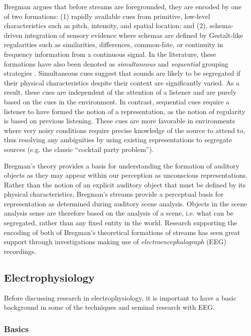 Bregman argues that before streams are foregrounded, they are encoded by one of two formations: (1) rapidly available cues from primitive, low-level characteristics such as pitch, intensity, and spatial location; and (2), schema-driven integration of sensory evidence where schemas are defined by Gestalt-like regularities such as similarities, differences, common-fate, or continuity in frequency information from a continuous signal.  In the literature, these formations have also been denoted as \textit{simultaneous} and \textit{sequential} grouping strategies \cite{Winkler2009a}.  Simultaneous cues suggest that sounds are likely to be segregated if their physical characteristics despite their context are significantly varied.  As a result, these cues are independent of the attention of a listener and are purely based on the cues in the environment.  In contrast, sequential cues require a listener to have formed the notion of a representation, as the notion of regularity is based on previous listening.  These cues are more favorable in environments where very noisy conditions require precise knowledge of the source to attend to, thus resolving any ambiguities by using existing representations to segregate sources (e.g. the classic ``cocktail party problem'').  

Bregman's theory provides a basis for understanding the formation of auditory objects as they may appear within our perception as unconscious representations.  Rather than the notion of an explicit auditory object that must be defined by its physical characteristics, Bregman's streams provide a perceptual basis for representation as determined during auditory scene analysis.  Objects in the scene analysis sense are therefore based on the analysis of a scene, i.e. what can be segregated, rather than any fixed entity in the world.  Research supporting the encoding of both of Bregman's theoretical formations of streams has seen great support through investigations making use of \textit{electroencephalograph} (EEG) recordings.  

\subsection{Electrophysiology}

Before discussing research in electrophysiology, it is important to have a basic background in some of the techniques and seminal research with EEG.  

\subsubsection{Basics}

